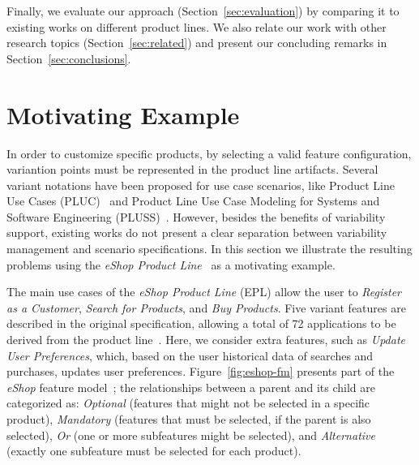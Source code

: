 \documentclass{report}
\begin{document}
\begin{frontmatter}
Finally, we evaluate our approach (Section~\ref{sec:evaluation}) by comparing it 
to existing works on different product lines.  We 
also relate our work with other research topics (Section~\ref{sec:related}) and present 
our concluding remarks in Section~\ref{sec:conclusions}.

\section{Motivating Example}
\label{sec:example}

In order to customize specific products, by selecting a valid feature
configuration, variantion points must be represented in the product line
artifacts. Several variant notations have been proposed for use case scenarios,
like  Product Line Use Cases (PLUC)~\cite{bertolino-esec-2003} and Product Line
Use Case Modeling for Systems and Software Engineering
(PLUSS)~\cite{eriksson-splc-2005}. However, besides the benefits of variability
support, existing works do not present a clear separation between variability
management and scenario specifications. In this section we illustrate the
resulting problems using the \emph{eShop Product Line}~\cite{eshop-url} as a
motivating example.

The main use cases of the \emph{eShop Product Line} (EPL) allow the user to
\emph{Register as a Customer}, \emph{Search for Products}, and \emph{Buy
Products}.  Five variant features are described in the original specification,
allowing a total  of 72 applications to be derived from the product
line~\cite{eshop-url}. Here, we consider extra features, such as \emph{Update
User Preferences}, which, based on the user historical data of searches and
purchases, updates user preferences. Figure~\ref{fig:eshop-fm} presents part of
the \emph{eShop} feature model~\cite{gheyi-alloy-06,czarnecki-book}; the
relationships between a parent and its child are categorized as: \emph{Optional}
(features that might not be selected in a specific product), \emph{Mandatory}
(features that must be selected, if the parent is also selected), \emph{Or} (one
or more subfeatures might be selected), and \emph{Alternative} (exactly one
subfeature must be selected for each product).


\end{frontmatter}
\end{document}
